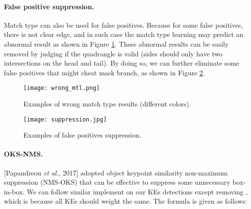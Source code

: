 \documentclass{article}
\begin{document}
\paragraph{False positive suppression.} Match type can also be used for false positives. Because for some false positives, there is not clear edge, and in such case the match type learning may predict an abnormal result as shown in Figure \ref{fig:wrong_mtl}. These abnormal results can be easily removed by judging if the quadrangle is valid (sides should only have two intersections on the head and tail). By doing so, we can further eliminate some false positives that might cheat mask branch, as shown in Figure \ref{fig:fpsuppress}.

\begin{figure}[!t]
  \centering
  \centerline{\texttt{[image: wrong\_mtl.png]}}
  \caption{Examples of wrong match type results (different colors).}\label{fig:wrong_mtl}
\end{figure}

\begin{figure}[!t]
  \centering
  \centerline{\texttt{[image: suppression.jpg]}}
  \caption{Examples of false positives suppression.}\label{fig:fpsuppress}
\end{figure}

\paragraph{OKS-NMS.} [Papandreou \textit{et al.}, 2017] adopted object keypoint similarity non-maximum suppression (NMS-OKS) that can be effective to suppress some unnecessary box-in-box. We can follow similar implement on our KEs detections except removing , which is because all KEs should weight the same. The formula is given as follows:
\end{document}

